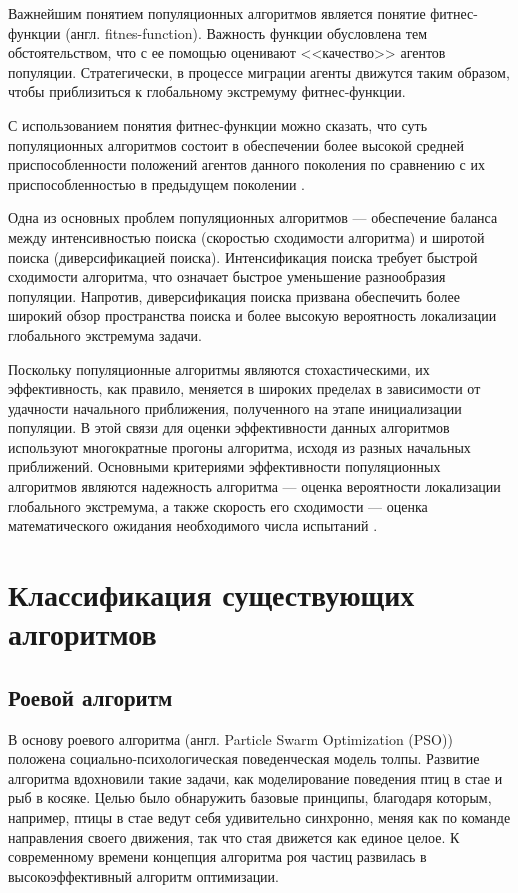 Важнейшим понятием популяционных алгоритмов является понятие фитнес-функции (англ. fitnes-function). Важность функции обусловлена тем обстоятельством, что с ее помощью оценивают <<качество>> агентов популяции. Стратегически, в процессе миграции агенты движутся таким образом, чтобы приблизиться к глобальному экстремуму фитнес-функции.  

С использованием понятия фитнес-функции можно сказать, что суть популяционных алгоритмов состоит в обеспечении более высокой средней приспособленности положений агентов данного поколения по сравнению с их приспособленностью в предыдущем поколении \cite{dusan}.

Одна из основных проблем популяционных алгоритмов --- обеспечение баланса между интенсивностью поиска (скоростью сходимости алгоритма) и широтой поиска (диверсификацией поиска). Интенсификация поиска требует быстрой сходимости алгоритма, что означает быстрое уменьшение разнообразия популяции. Напротив, диверсификация поиска призвана обеспечить более широкий обзор пространства поиска и более высокую вероятность локализации глобального экстремума задачи.

Поскольку популяционные алгоритмы являются стохастическими, их эффективность, как правило, меняется в широких пределах в зависимости от удачности начального приближения, полученного на этапе инициализации популяции. В этой связи для оценки эффективности данных алгоритмов используют многократные прогоны алгоритма, исходя из разных начальных приближений. Основными критериями эффективности популяционных алгоритмов являются надежность алгоритма --- оценка вероятности локализации глобального экстремума, а также скорость его сходимости --- оценка математического ожидания необходимого числа испытаний \cite{karpenko}.



\chapter{Классификация существующих алгоритмов}

\section{Роевой алгоритм}
В основу роевого алгоритма (англ. Particle Swarm Optimization (PSO)) \cite{ershov1} положена социально-психологическая поведенческая модель толпы. Развитие алгоритма вдохновили такие задачи, как моделирование поведения птиц в стае и рыб в косяке. Целью было обнаружить базовые принципы, благодаря которым, например, птицы в стае ведут себя удивительно синхронно, меняя как по команде направления своего движения, так что стая движется как единое целое. К современному времени концепция алгоритма роя частиц развилась в высокоэффективный алгоритм оптимизации.  

